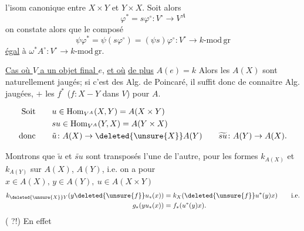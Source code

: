 
 l'isom canonique entre $X\times Y$ et $Y\times X$. Soit alors
\[
 \varphi^{*}=s\varphi^{\circ}\colon V^{\circ}\longrightarrow V^{A}
\]
on constate alors que le composé
\[
 \psi\varphi^{*}=\psi(s\varphi^{\circ})=(\psi s)\varphi^{\circ}
 \colon V^{\circ}\longrightarrow k\text{-}\mathrm{mod}\,\mathrm{gr}
\]
   \uline{égal} à $\omega^{*}A^{\circ}\colon V^{\circ}\longrightarrow k\text{-}\mathrm{mod}\,\mathrm{gr}$.


\uline{Cas où $V$ a un objet final $e$}, \uline{et où} \uline{de plus} $A(e)=k$  Alors les $A(X)$ sont naturellement jaugés; si c'est des Alg. de Poincaré, il suffit donc de connaitre  Alg. jaugées, $+$ les $f^{*}$ ($f\colon X\mathbin{-}Y$ dans $V$) pour  $A$.

\[
\begin{aligned}
 \text{Soit}\qquad &u\in\operatorname{Hom}_{V^{A}}(X,Y)=A(X\times Y)\\
 &su\in\operatorname{Hom}_{V^{A}}(Y,X)=A(Y\times X)\\
 \text{donc}\qquad &\tilde u\colon A(X)\to\deleted{\unsure{X}}A(Y)
 \qquad \widetilde{su}\colon A(Y)\to A(X).
\end{aligned}
\]

Montrons que  $\tilde u$ et $\widetilde{su}$ sont transposés l'une de l'autre, pour les formes $k_{A(X)}$ et $k_{A(Y)}$ sur $A(X)$, $A(Y)$, i.e. on a pour $x\in A(X),\,y\in A(Y),\ u\in A(X\times Y)$
\[
\begin{aligned}
 k_{\deleted{\unsure{X}}Y}(y\deleted{\unsure{f}}u_{*}(x))&=k_X(\deleted{\unsure{f}}u^{*}(y)x)\qquad \text{i.e.}\\
 g_{*}(yu_{*}(x))&=f_{*}(u^{*}(y)x).
\end{aligned}
\]
( ?!) En effet


